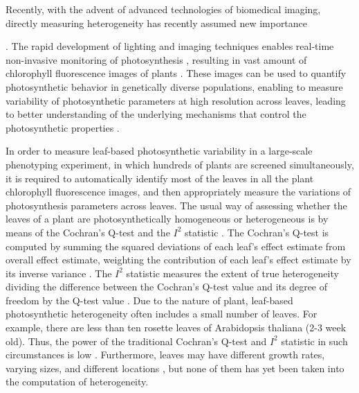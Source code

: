 Recently, with the advent of advanced technologies of biomedical imaging, directly measuring heterogeneity has recently assumed new importance {\cite{cruz2014depi,tiihonen1996cerebral,wieneke1999non,wang2000}. The rapid development of lighting and imaging techniques enables real-time non-invasive monitoring of photosynthesis \cite{cruz2014depi,houle2010phenomics}, resulting in vast amount of chlorophyll fluorescence images of plants \cite{wituszynska2013multivariable}. These images can be used to quantify photosynthetic behavior in genetically diverse populations, enabling to measure variability of photosynthetic parameters at high resolution across leaves, leading to better understanding of the underlying mechanisms that control the photosynthetic properties \cite{fiorani2013future,rascher2011non}.



In order to measure leaf-based photosynthetic variability in a large-scale phenotyping experiment, in which hundreds of plants are screened simultaneously, it is required to automatically identify most of the leaves in all the plant chlorophyll fluorescence images, and then appropriately measure the variations of photosynthesis parameters across leaves. 
%
The usual way of assessing whether the leaves of a plant are photosynthetically homogeneous or heterogeneous is by means of the Cochran's Q-test \cite{conover1999Practical} and the $I^2$ statistic \cite{higgins2003measuring,higgins2002quantifying}. %
%
The Cochran's Q-test is computed by summing the squared deviations of each leaf's effect estimate from overall effect estimate, weighting the contribution of each leaf's effect estimate by its inverse variance \cite{conover1999Practical}.
%
The $I^2$ statistic measures the extent of true heterogeneity dividing the difference between the Cochran's Q-test value and its degree of freedom by the Q-test value \cite{higgins2003measuring,higgins2002quantifying}.
%
Due to the nature of plant, leaf-based photosynthetic heterogeneity often includes a small number of leaves. For example, there are less than ten rosette leaves of Arabidopsis thaliana (2-3 week old). Thus, the power of the traditional Cochran's Q-test and $I^2$ statistic in such circumstances is low \cite{higgins2003measuring, gavaghan2000evaluation,huedo2006assessing,ioannidis2007uncertainty}. Furthermore, leaves may have different growth rates, varying sizes, and different locations \cite{van1991insertional}, but none of them has yet been taken into the computation of heterogeneity.

}
